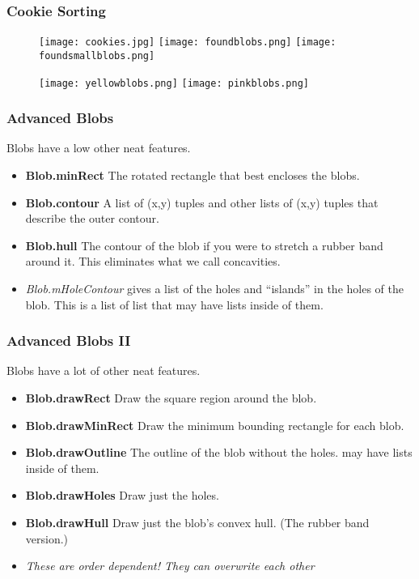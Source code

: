 \documentclass[compress]{beamer}
\begin{document}
\begin{frame}
\frametitle{Cookie Sorting}
 \begin{figure}
     \texttt{[image: cookies.jpg]}
     \quad
     \texttt{[image: foundblobs.png]}
     \quad
     \texttt{[image: foundsmallblobs.png]}
 \end{figure}
 \begin{figure}
     \texttt{[image: yellowblobs.png]}
     \quad
     \texttt{[image: pinkblobs.png]}
 \end{figure}
\end{frame}
\begin{frame}
  \frametitle{Advanced Blobs}
Blobs have a low other neat features.
\begin{itemize}
\item \textbf{Blob.minRect} The rotated rectangle that best encloses
  the blobs.
\item \textbf{Blob.contour} A list of (x,y) tuples and other lists of
  (x,y) tuples that describe the outer contour.
\item \textbf{Blob.hull} The contour of the blob if you were
  to stretch a rubber band around it. This eliminates what we call
  concavities.
\item \textit{Blob.mHoleContour} gives a list of the holes and
  ``islands'' in the holes of the blob. This is a list of list that
  may have lists inside of them. 
\end{itemize}
\end{frame}
\begin{frame}
  \frametitle{Advanced Blobs II}
Blobs have a lot of other neat features.
\begin{itemize}
\item \textbf{Blob.drawRect} Draw the square region around the blob.
\item \textbf{Blob.drawMinRect} Draw the minimum bounding rectangle
  for each blob.
\item \textbf{Blob.drawOutline} The outline of the blob without the holes.
  may have lists inside of them. 
\item \textbf{Blob.drawHoles} Draw just the holes. 
\item \textbf{Blob.drawHull} Draw just the blob's convex hull. (The
  rubber band version.)
\item \textit{These are order dependent! They can overwrite each other}
\end{itemize}
\end{frame}
\end{document}
